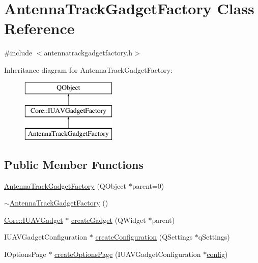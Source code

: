 \hypertarget{class_antenna_track_gadget_factory}{\section{Antenna\-Track\-Gadget\-Factory Class Reference}
\label{class_antenna_track_gadget_factory}
}


{\ttfamily \#include $<$antennatrackgadgetfactory.\-h$>$}

Inheritance diagram for Antenna\-Track\-Gadget\-Factory\-:\begin{figure}[H]
\begin{center}
\leavevmode
\includegraphics[height=3.000000cm]{class_antenna_track_gadget_factory}
\end{center}
\end{figure}
\subsection*{Public Member Functions}
\begin{DoxyCompactItemize}
\item 
\hyperlink{group___antenna_track_gadget_plugin_ga1ef8f35faf1ffe91c15080461b78649c}{Antenna\-Track\-Gadget\-Factory} (Q\-Object $\ast$parent=0)
\item 
\hyperlink{group___antenna_track_gadget_plugin_ga6d885117d7af90d116622d81273651cd}{$\sim$\-Antenna\-Track\-Gadget\-Factory} ()
\item 
\hyperlink{class_core_1_1_i_u_a_v_gadget}{Core\-::\-I\-U\-A\-V\-Gadget} $\ast$ \hyperlink{group___antenna_track_gadget_plugin_ga50d1ad5798eee9e1ca60c3e1bf0559fc}{create\-Gadget} (Q\-Widget $\ast$parent)
\item 
I\-U\-A\-V\-Gadget\-Configuration $\ast$ \hyperlink{group___antenna_track_gadget_plugin_gaa4cb4bdba7574a5ba89c52f6791bc6d4}{create\-Configuration} (Q\-Settings $\ast$q\-Settings)
\item 
I\-Options\-Page $\ast$ \hyperlink{group___antenna_track_gadget_plugin_ga7645577ffc0de3e891b3ea2388c73e48}{create\-Options\-Page} (I\-U\-A\-V\-Gadget\-Configuration $\ast$\hyperlink{deflate_8c_a4473b5227787415097004fd39f55185e}{config})
\end{DoxyCompactItemize}
